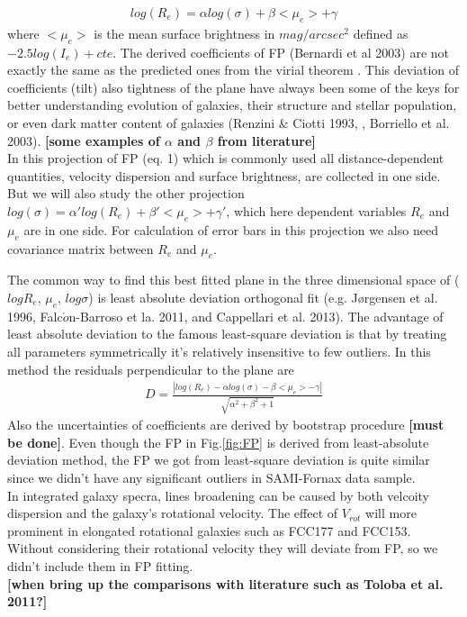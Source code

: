\documentclass{aa}
\begin{document}
\begin{eqnarray}
	log(R_e) = \alpha log(\sigma) + \beta <\mu_e> + \gamma
\end{eqnarray}
where $<\mu_e>$ is the mean surface brightness in $mag/arcsec^{2}$ defined as $-2.5log(I_e)+cte$. 
The derived coefficients of FP (Bernardi et al 2003) are not exactly the same as the predicted ones from the virial theorem . This deviation of coefficients (tilt) also tightness of the plane have always been some of the keys for better understanding evolution of galaxies, their structure and stellar population, or even dark matter content of galaxies (Renzini \& Ciotti 1993, ,  Borriello et al. 2003). \textbf{[some examples of $\alpha$ and $\beta$ from literature]}
\\In this projection of FP (eq. 1) which is commonly used all distance-dependent quantities, velocity dispersion and surface brightness, are collected in one side. But we will also study the other projection $log(\sigma) = \alpha' log(R_e) + \beta' <\mu_e> + \gamma'$, which here dependent variables $R_e$ and $\mu_e$ are in one side. For calculation of error bars in this projection we also need covariance matrix between $R_e$ and $\mu_e$.

The common way to find this best fitted plane in the three dimensional space of ($logR_e$, $\mu_e$, $log\sigma$) is least absolute deviation orthogonal fit (e.g. J\o rgensen et al. 1996, Falc$\acute{o}$n-Barroso et la. 2011, and Cappellari et al. 2013). The advantage of least absolute deviation to the famous least-square deviation is that by treating all parameters symmetrically it's relatively insensitive to few outliers. In this method the residuals perpendicular to the plane are 
\begin{eqnarray}
	D = \frac{| log(R_e)-\alpha log(\sigma)-\beta <\mu_e>-\gamma |}{\sqrt{\alpha^2+\beta^2+1}}
\end{eqnarray}
Also the uncertainties of coefficients are derived by bootstrap procedure \textbf{[must be done]}. Even though the FP in Fig.\ref{fig:FP} is derived from least-absolute deviation method, the FP we got from least-square deviation is quite similar since we didn't have any significant outliers in SAMI-Fornax data sample.
\\In integrated galaxy specra, lines broadening  can be caused by both velcoity dispersion and the galaxy's rotational velocity. The effect of $V_{rot}$ will more prominent in elongated rotational galaxies such as FCC177 and FCC153. Without considering their rotational velocity they will deviate from FP, so we didn't include them in FP fitting.
\\
\textbf{[when bring up the comparisons with literature such as Toloba et al. 2011?]}\\
\end{document}
